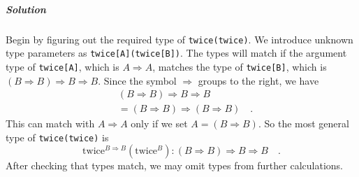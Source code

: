 \subparagraph{Solution}

Begin by figuring out the required type of \lstinline!twice(twice)!.
We introduce unknown type parameters as \lstinline!twice[A](twice[B])!.
The types will match if the argument type of \lstinline!twice[A]!,
which is $A\Rightarrow A$, matches the type of \lstinline!twice[B]!,
which is $\left(B\Rightarrow B\right)\Rightarrow B\Rightarrow B$.
Since the symbol $\Rightarrow$ groups to the right, we have 
\begin{align*}
 & \left(B\Rightarrow B\right)\Rightarrow B\Rightarrow B\\
 & =\left(B\Rightarrow B\right)\Rightarrow\left(B\Rightarrow B\right)\quad.
\end{align*}
This can match with $A\Rightarrow A$ only if we set $A=\left(B\Rightarrow B\right)$.
So the most general type of \lstinline!twice(twice)!
is
\begin{equation}
\text{twice}^{B\Rightarrow B}(\text{twice}^{B}):\left(B\Rightarrow B\right)\Rightarrow B\Rightarrow B\quad.\label{eq:hof-twice-example-solved3}
\end{equation}
After checking that types match, we may omit types from further calculations.


